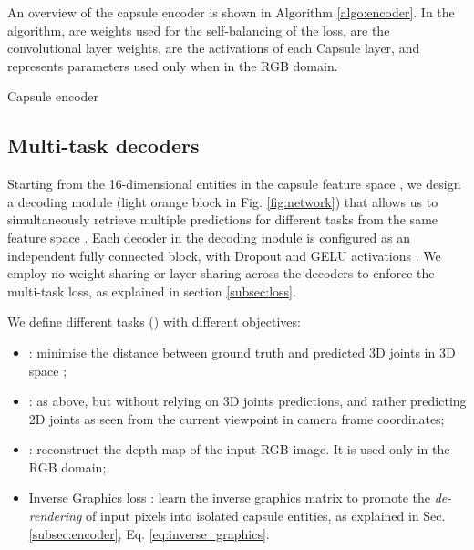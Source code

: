 \documentclass[10pt,twocolumn,letterpaper]{article}
\begin{document}
An overview of the capsule encoder is shown in Algorithm \ref{algo:encoder}. In the algorithm,  are weights used for the self-balancing of the loss,  are the convolutional layer weights,  are the activations of each Capsule layer, and  represents parameters used only when in the RGB domain. 

\begin{algorithm}
  \caption{Capsule encoder}

 \label{algo:encoder}
\end{algorithm}


\subsection{Multi-task decoders}
\label{subsec:decoders}

Starting from the 16-dimensional entities in the capsule feature space , we design a decoding module (light orange block in Fig. \ref{fig:network}) that allows us to simultaneously retrieve multiple predictions for different tasks from the same feature space .
Each decoder  in the decoding module is configured as an independent fully connected block, with  Dropout and GELU activations \cite{hendrycks2016gaussian}. We employ no weight sharing or layer sharing across the decoders to enforce the multi-task loss, as explained in section \ref{subsec:loss}. 

We define different tasks () with different objectives:

\begin{itemize}
    \item : minimise the distance between ground truth and predicted 3D joints in 3D space ;
    \item : as above, but without relying on 3D joints predictions, and rather predicting 2D joints  as seen from the current viewpoint in camera frame coordinates;
    \item : reconstruct the depth map  of the input RGB image. It is used only in the RGB domain;
    \item  Inverse Graphics loss : learn the inverse graphics matrix  to promote the \textit{de-rendering} of input pixels into isolated capsule entities, as explained in Sec. \ref{subsec:encoder}, Eq. \ref{eq:inverse_graphics}.
\end{itemize}
\end{document}
